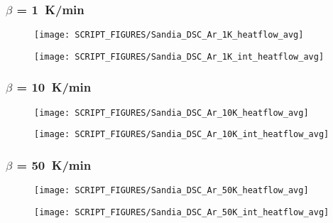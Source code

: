 \subsubsection{$\beta$ = 1~K/min}
\begin{minipage}{0.5\textwidth}
\begin{figure}[H]
{\texttt{[image: SCRIPT\_FIGURES/Sandia\_DSC\_Ar\_1K\_heatflow\_avg]}}\\
\end{figure}
\end{minipage} 
\begin{minipage}{0.35\textwidth}
\begin{figure}[H]
{\texttt{[image: SCRIPT\_FIGURES/Sandia\_DSC\_Ar\_1K\_int\_heatflow\_avg]}}\\
\end{figure}
\end{minipage}
\subsubsection{$\beta$ = 10~K/min}
\begin{minipage}{0.5\textwidth}
\begin{figure}[H]
{\texttt{[image: SCRIPT\_FIGURES/Sandia\_DSC\_Ar\_10K\_heatflow\_avg]}}\\
\end{figure}
\end{minipage} 
\begin{minipage}{0.35\textwidth}
\begin{figure}[H]
{\texttt{[image: SCRIPT\_FIGURES/Sandia\_DSC\_Ar\_10K\_int\_heatflow\_avg]}}\\
\end{figure}
\end{minipage}
\subsubsection{$\beta$ = 50~K/min}
\begin{minipage}{0.5\textwidth}
\begin{figure}[H]
{\texttt{[image: SCRIPT\_FIGURES/Sandia\_DSC\_Ar\_50K\_heatflow\_avg]}}\\
\end{figure}
\end{minipage} 
\begin{minipage}{0.35\textwidth}
\begin{figure}[H]
{\texttt{[image: SCRIPT\_FIGURES/Sandia\_DSC\_Ar\_50K\_int\_heatflow\_avg]}}\\
\end{figure}
\end{minipage}
\vfill

